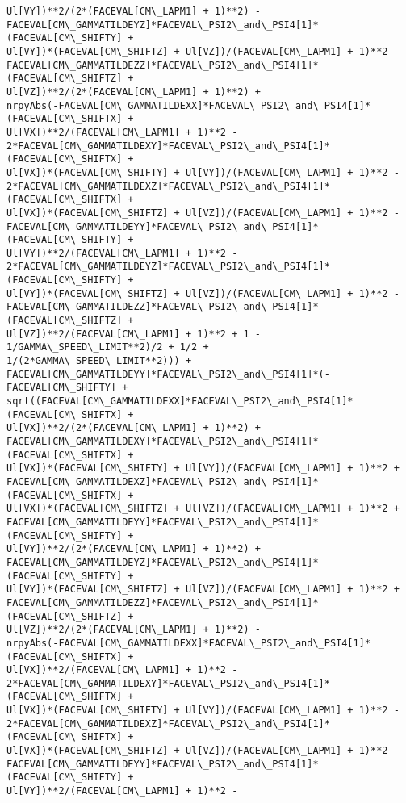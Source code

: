 \documentclass[landscape,letterpaper,10pt,english]{article}
\begin{document}
\begin{Verbatim}[commandchars=\\\{\}]
Ul[VY])**2/(2*(FACEVAL[CM\_LAPM1] + 1)**2) -
FACEVAL[CM\_GAMMATILDEYZ]*FACEVAL\_PSI2\_and\_PSI4[1]*(FACEVAL[CM\_SHIFTY] +
Ul[VY])*(FACEVAL[CM\_SHIFTZ] + Ul[VZ])/(FACEVAL[CM\_LAPM1] + 1)**2 -
FACEVAL[CM\_GAMMATILDEZZ]*FACEVAL\_PSI2\_and\_PSI4[1]*(FACEVAL[CM\_SHIFTZ] +
Ul[VZ])**2/(2*(FACEVAL[CM\_LAPM1] + 1)**2) +
nrpyAbs(-FACEVAL[CM\_GAMMATILDEXX]*FACEVAL\_PSI2\_and\_PSI4[1]*(FACEVAL[CM\_SHIFTX] +
Ul[VX])**2/(FACEVAL[CM\_LAPM1] + 1)**2 -
2*FACEVAL[CM\_GAMMATILDEXY]*FACEVAL\_PSI2\_and\_PSI4[1]*(FACEVAL[CM\_SHIFTX] +
Ul[VX])*(FACEVAL[CM\_SHIFTY] + Ul[VY])/(FACEVAL[CM\_LAPM1] + 1)**2 -
2*FACEVAL[CM\_GAMMATILDEXZ]*FACEVAL\_PSI2\_and\_PSI4[1]*(FACEVAL[CM\_SHIFTX] +
Ul[VX])*(FACEVAL[CM\_SHIFTZ] + Ul[VZ])/(FACEVAL[CM\_LAPM1] + 1)**2 -
FACEVAL[CM\_GAMMATILDEYY]*FACEVAL\_PSI2\_and\_PSI4[1]*(FACEVAL[CM\_SHIFTY] +
Ul[VY])**2/(FACEVAL[CM\_LAPM1] + 1)**2 -
2*FACEVAL[CM\_GAMMATILDEYZ]*FACEVAL\_PSI2\_and\_PSI4[1]*(FACEVAL[CM\_SHIFTY] +
Ul[VY])*(FACEVAL[CM\_SHIFTZ] + Ul[VZ])/(FACEVAL[CM\_LAPM1] + 1)**2 -
FACEVAL[CM\_GAMMATILDEZZ]*FACEVAL\_PSI2\_and\_PSI4[1]*(FACEVAL[CM\_SHIFTZ] +
Ul[VZ])**2/(FACEVAL[CM\_LAPM1] + 1)**2 + 1 - 1/GAMMA\_SPEED\_LIMIT**2)/2 + 1/2 +
1/(2*GAMMA\_SPEED\_LIMIT**2))) +
FACEVAL[CM\_GAMMATILDEYY]*FACEVAL\_PSI2\_and\_PSI4[1]*(-FACEVAL[CM\_SHIFTY] +
sqrt((FACEVAL[CM\_GAMMATILDEXX]*FACEVAL\_PSI2\_and\_PSI4[1]*(FACEVAL[CM\_SHIFTX] +
Ul[VX])**2/(2*(FACEVAL[CM\_LAPM1] + 1)**2) +
FACEVAL[CM\_GAMMATILDEXY]*FACEVAL\_PSI2\_and\_PSI4[1]*(FACEVAL[CM\_SHIFTX] +
Ul[VX])*(FACEVAL[CM\_SHIFTY] + Ul[VY])/(FACEVAL[CM\_LAPM1] + 1)**2 +
FACEVAL[CM\_GAMMATILDEXZ]*FACEVAL\_PSI2\_and\_PSI4[1]*(FACEVAL[CM\_SHIFTX] +
Ul[VX])*(FACEVAL[CM\_SHIFTZ] + Ul[VZ])/(FACEVAL[CM\_LAPM1] + 1)**2 +
FACEVAL[CM\_GAMMATILDEYY]*FACEVAL\_PSI2\_and\_PSI4[1]*(FACEVAL[CM\_SHIFTY] +
Ul[VY])**2/(2*(FACEVAL[CM\_LAPM1] + 1)**2) +
FACEVAL[CM\_GAMMATILDEYZ]*FACEVAL\_PSI2\_and\_PSI4[1]*(FACEVAL[CM\_SHIFTY] +
Ul[VY])*(FACEVAL[CM\_SHIFTZ] + Ul[VZ])/(FACEVAL[CM\_LAPM1] + 1)**2 +
FACEVAL[CM\_GAMMATILDEZZ]*FACEVAL\_PSI2\_and\_PSI4[1]*(FACEVAL[CM\_SHIFTZ] +
Ul[VZ])**2/(2*(FACEVAL[CM\_LAPM1] + 1)**2) -
nrpyAbs(-FACEVAL[CM\_GAMMATILDEXX]*FACEVAL\_PSI2\_and\_PSI4[1]*(FACEVAL[CM\_SHIFTX] +
Ul[VX])**2/(FACEVAL[CM\_LAPM1] + 1)**2 -
2*FACEVAL[CM\_GAMMATILDEXY]*FACEVAL\_PSI2\_and\_PSI4[1]*(FACEVAL[CM\_SHIFTX] +
Ul[VX])*(FACEVAL[CM\_SHIFTY] + Ul[VY])/(FACEVAL[CM\_LAPM1] + 1)**2 -
2*FACEVAL[CM\_GAMMATILDEXZ]*FACEVAL\_PSI2\_and\_PSI4[1]*(FACEVAL[CM\_SHIFTX] +
Ul[VX])*(FACEVAL[CM\_SHIFTZ] + Ul[VZ])/(FACEVAL[CM\_LAPM1] + 1)**2 -
FACEVAL[CM\_GAMMATILDEYY]*FACEVAL\_PSI2\_and\_PSI4[1]*(FACEVAL[CM\_SHIFTY] +
Ul[VY])**2/(FACEVAL[CM\_LAPM1] + 1)**2 -

\end{Verbatim}
\end{document}
